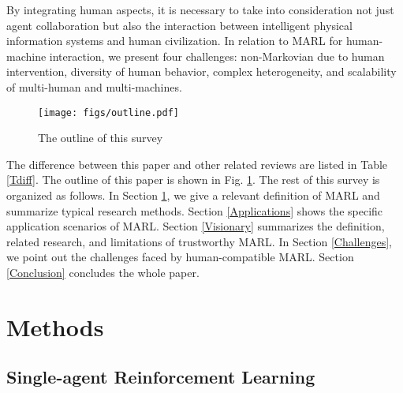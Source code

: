 \documentclass[acmsmall]{acmart}
\begin{document}
By integrating human aspects, it is necessary to take into consideration not just agent collaboration but also the interaction between intelligent physical information systems and human civilization. In relation to MARL for human-machine interaction, we present four challenges: non-Markovian due to human intervention, diversity of human behavior, complex heterogeneity, and scalability of multi-human and multi-machines.

\begin{figure}
    \centering
    \texttt{[image: figs/outline.pdf]}
    \caption{The outline of this survey}
    \label{outline}
\end{figure}

The difference between this paper and other related reviews are listed in Table \ref{Tdiff}. The outline of this paper is shown in Fig. \ref{outline}. The rest of this survey is organized as follows. In Section \ref{Preliminary}, we give a relevant definition of MARL and summarize typical research methods. Section \ref{Applications} shows the specific application scenarios of MARL. Section \ref{Visionary} summarizes the definition, related research, and limitations of trustworthy MARL. In Section \ref{Challenges}, we point out the challenges faced by human-compatible MARL. Section \ref{Conclusion} concludes the whole paper. 
\section{Methods} \label{Preliminary}

\subsection{Single-agent Reinforcement Learning}
\end{document}
